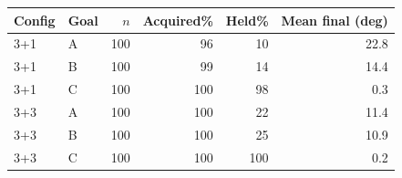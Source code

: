 \begin{tabular}{l l r r r r}
\hline
Config & Goal & $n$ & Acquired\% & Held\% & Mean final (deg) \\
\hline
3+1 & A & 100 & 96 & 10 & 22.8 \\
3+1 & B & 100 & 99 & 14 & 14.4 \\
3+1 & C & 100 & 100 & 98 & 0.3 \\
\hline
3+3 & A & 100 & 100 & 22 & 11.4 \\
3+3 & B & 100 & 100 & 25 & 10.9 \\
3+3 & C & 100 & 100 & 100 & 0.2 \\
\hline
\end{tabular}
